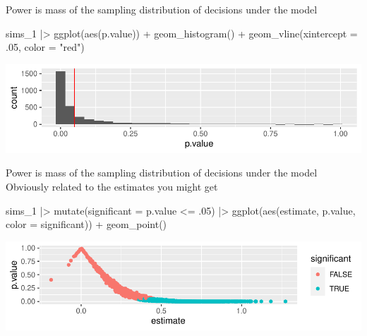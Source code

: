 \documentclass[
  11pt,
  ignorenonframetext,
]{beamer}
\newenvironment{Shaded}{\begin{snugshade}}{\end{snugshade}}
\newcommand{\AttributeTok}[1]{\textcolor[rgb]{0.40,0.45,0.13}{#1}}
\newcommand{\DecValTok}[1]{\textcolor[rgb]{0.68,0.00,0.00}{#1}}
\newcommand{\FunctionTok}[1]{\textcolor[rgb]{0.28,0.35,0.67}{#1}}
\newcommand{\NormalTok}[1]{\textcolor[rgb]{0.00,0.23,0.31}{#1}}
\newcommand{\SpecialCharTok}[1]{\textcolor[rgb]{0.37,0.37,0.37}{#1}}
\newcommand{\StringTok}[1]{\textcolor[rgb]{0.13,0.47,0.30}{#1}}
\begin{document}
\begin{frame}[fragile]{Power is mass of the sampling distribution of
decisions under the model}
\protect\hypertarget{power-is-mass-of-the-sampling-distribution-of-decisions-under-the-model-1}{}
\begin{Shaded}
\begin{Highlighting}[]
\NormalTok{sims\_1 }\SpecialCharTok{|\textgreater{}}
  \FunctionTok{ggplot}\NormalTok{(}\FunctionTok{aes}\NormalTok{(p.value)) }\SpecialCharTok{+} 
  \FunctionTok{geom\_histogram}\NormalTok{() }\SpecialCharTok{+}
  \FunctionTok{geom\_vline}\NormalTok{(}\AttributeTok{xintercept =}\NormalTok{ .}\DecValTok{05}\NormalTok{, }\AttributeTok{color =} \StringTok{"red"}\NormalTok{)}
\end{Highlighting}
\end{Shaded}

\includegraphics{0_lectures_files/figure-beamer/unnamed-chunk-442-1.pdf}
\end{frame}

\begin{frame}[fragile]{Power is mass of the sampling distribution of
decisions under the model}
\protect\hypertarget{power-is-mass-of-the-sampling-distribution-of-decisions-under-the-model-2}{}
Obviously related to the estimates you might get

\begin{Shaded}
\begin{Highlighting}[]
\NormalTok{sims\_1 }\SpecialCharTok{|\textgreater{}}
  \FunctionTok{mutate}\NormalTok{(}\AttributeTok{significant =}\NormalTok{ p.value }\SpecialCharTok{\textless{}=}\NormalTok{ .}\DecValTok{05}\NormalTok{) }\SpecialCharTok{|\textgreater{}}
  \FunctionTok{ggplot}\NormalTok{(}\FunctionTok{aes}\NormalTok{(estimate, p.value, }\AttributeTok{color =}\NormalTok{ significant)) }\SpecialCharTok{+} 
  \FunctionTok{geom\_point}\NormalTok{()}
\end{Highlighting}
\end{Shaded}

\includegraphics{0_lectures_files/figure-beamer/unnamed-chunk-443-1.pdf}
\end{frame}
\end{document}
